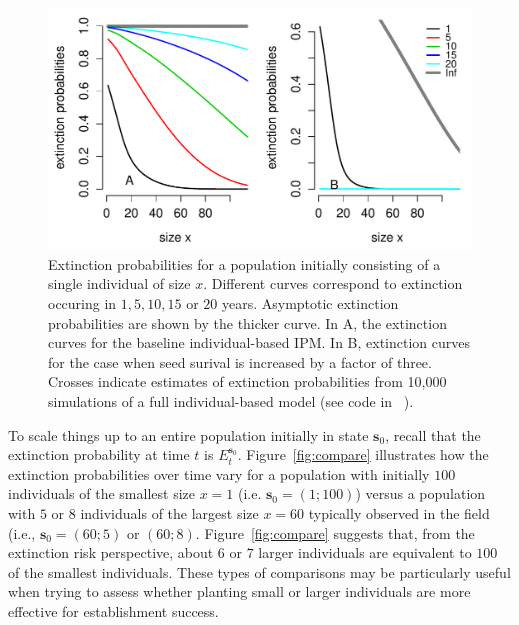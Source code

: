 \documentclass[12pt]{amsart}\usepackage[]{graphicx}\usepackage[]{color}
\makeatletter
\def\maxwidth{ %
  \ifdim\Gin@nat@width>\linewidth
    \linewidth
  \else
    \Gin@nat@width
  \fi
}
\newenvironment{knitrout}{}{} %
\def\s{\mathbf s}
\makeatother
\begin{document}
\begin{knitrout}
\color{fgcolor}\begin{figure}
\includegraphics[width=\maxwidth]{figure/extinction-1} \caption[Extinction probabilities for a population initially consisting of a single individual of size ]{Extinction probabilities for a population initially consisting of a single individual of size $x$. Different curves correspond to extinction occuring in $1, 5, 10, 15$ or $20$ years. Asymptotic extinction probabilities are shown by the thicker curve. In A, the extinction curves for the baseline individual-based IPM. In B, extinction curves for the case when seed surival is increased by a factor of three. Crosses indicate estimates of extinction probabilities from 10,000 simulations of a full individual-based model (see code in ~\citep{schreiber-ross-ibipm-code-2015}).}\label{fig:extinction}
\end{figure}


\end{knitrout}

To scale things up to an entire population initially in state $\s_0$, recall that the extinction probability at time $t$ is $E_t^{\s_0}$. Figure~\ref{fig:compare} illustrates how the extinction probabilities over time vary for a population with initially $100$ individuals of the smallest size $x=1$ (i.e. $\s_0=(1;100)$) versus a population with $5$ or $8$ individuals of the largest size $x=60$ typically observed in the field (i.e., $\s_0=(60;5)$ or $(60;8)$. Figure~\ref{fig:compare} suggests that, from the extinction risk perspective, about $6$ or $7$ larger individuals are equivalent to $100$ of the smallest individuals. These types of comparisons may be particularly useful when trying to assess whether planting small or larger individuals are more effective for establishment success.
\end{document}

